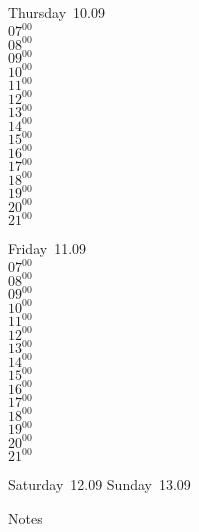 \documentclass[11pt,a4paper]{book}\usepackage[]{graphicx}\usepackage[]{color}
\begin{document}
\clearpage
\begin{headerbox}
\end{headerbox}
\begin{weekdaybox}
  Thursday~10.09\\
  { 
  \vfill
  $07^{00}$\\
$08^{00}$\\
$09^{00}$\\
$10^{00}$\\
$11^{00}$\\
$12^{00}$\\
$13^{00}$\\
$14^{00}$\\
$15^{00}$\\
$16^{00}$\\
$17^{00}$\\
$18^{00}$\\
$19^{00}$\\
$20^{00}$\\
$21^{00}$\\
  }
\end{weekdaybox} 
\begin{weekdaybox}
  Friday~11.09\\
  { 
  \vfill
  $07^{00}$\\
$08^{00}$\\
$09^{00}$\\
$10^{00}$\\
$11^{00}$\\
$12^{00}$\\
$13^{00}$\\
$14^{00}$\\
$15^{00}$\\
$16^{00}$\\
$17^{00}$\\
$18^{00}$\\
$19^{00}$\\
$20^{00}$\\
$21^{00}$\\
  }
\end{weekdaybox}
\begin{weekendbox}
  Saturday~12.09
  \tcblower
  Sunday~13.09
\end{weekendbox} %
\begin{notebox}
  Notes
\end{notebox}
\clearpage
\end{document}
